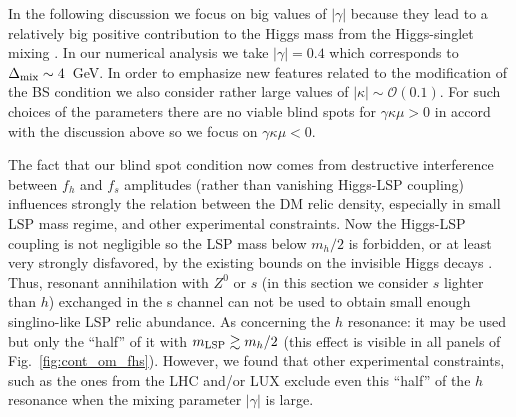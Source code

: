 \documentclass[12pt,twoside]{article}
\begin{document}
In the following discussion we focus on big values of $|\gamma|$ because 
they lead to a relatively big positive contribution to the Higgs mass from 
the Higgs-singlet mixing \cite{Badziak:2013bda}. In our numerical analysis 
we take $|\gamma|=0.4$ which corresponds to $\Delta_{\rm mix}\sim 4$~GeV. 
In order to emphasize new features related to the modification of the BS 
condition we also consider rather large values of 
$|\kappa|\sim\mathcal{O}(0.1)$. For such choices of the parameters there 
are no viable blind spots for $\gamma\kappa\mu>0$ in accord with the  
discussion above so we focus on $\gamma\kappa\mu<0$. 


The fact that our blind spot condition now comes from destructive interference 
between $f_h$ and $f_s$ amplitudes (rather than vanishing Higgs-LSP coupling) 
influences strongly the relation between the DM relic density, especially 
in small LSP mass regime, and other experimental constraints. 
Now the Higgs-LSP coupling is not negligible so the LSP mass below $m_h/2$ 
is forbidden, or at least very strongly disfavored, by the existing bounds 
on the invisible Higgs decays \cite{Higgs_inv_exp}. Thus, resonant annihilation with $Z^0$ or $s$ 
(in this section we consider $s$ lighter than $h$) exchanged in the s channel 
can not be used to obtain small enough singlino-like LSP relic abundance. 
As concerning the $h$ resonance: it may be used but only the ``half'' of it 
with $m_{\rm LSP}\gtrsim m_h/2$ (this effect is visible in all panels of 
Fig.~\ref{fig:cont_om_fhs}). However, we found that other experimental constraints, such as the ones from the LHC and/or LUX
exclude even this ``half'' of the $h$ resonance when the mixing parameter 
$|\gamma|$ is large.
\end{document}
